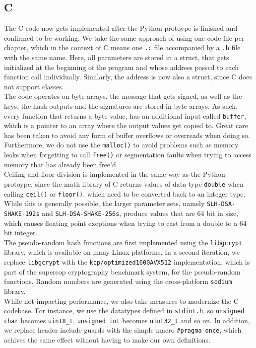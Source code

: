 \documentclass[journal=tosc,notanonymous]{iacrtrans}
\begin{document}
\subsection{C}

The C code now gets implemented after the Python protoype is finished and confirmed to be working.
We take the same approach of using one code file per chapter, which in the context of C means one \texttt{.c} file accompanied by a \texttt{.h} file with the same name.
Here, all parameters are stored in a struct, that gets initialized at the beginning of the program and whose address passed to each function call individually.
Similarly, the address is now also a struct, since C does not support classes.
\\
The code operates on byte arrays, the message that gets signed, as well as the keys, the hash outputs and the signatures are stored in byte arrays.
As such, every function that returns a byte value, has an additional input called \texttt{buffer}, which is a pointer to an array where the output values get copied to.
Great care has been taken to avoid any form of buffer overflows or overreads when doing so.
Furthermore, we do not use the \texttt{malloc()} to avoid problems such as memory leaks when forgetting to call \texttt{free()} or segmentation faults when trying to access memory that has already been free'd.
\\
Ceiling and floor division is implemented in the same way as the Python protoype, since the math library of C returns values of data type \texttt{double} when calling \texttt{ceil()} or \texttt{floor()}, which need to be converted back to an integer type.
While this is generally possible, the larger parameter sets, namely \texttt{SLH-DSA-SHAKE-192s} and \texttt{SLH-DSA-SHAKE-256s}, produce values that are 64 bit in size, which causes floating point exeptions when trying to cast from a double to a 64 bit integer.
\\
The pseudo-random hash functions are first implemented using the \texttt{libgcrypt} library, which is available on many Linux platforms.
In a second iteration, we replace \texttt{libgcrypt} with the \texttt{kcp/optimized1600AVX512} implementation, which is part of the supercop cryptography benchmark system, for the pseudo-random functions.
Random numbers are generated using the cross-platform \texttt{sodium} library.
\\
While not impacting performance, we also take measures to modernize the C codebase.
For instance, we use the datatypes defined in \texttt{stdint.h}, so \texttt{unsigned char} becomes \texttt{uint8\_t}, \texttt{unsigned int} becomes \texttt{uint32\_t} and so on.
In addition, we replace header include guards with the simple macro \texttt{\#pragma once}, which achives the same effect without having to make our own definitions.




\end{document}
